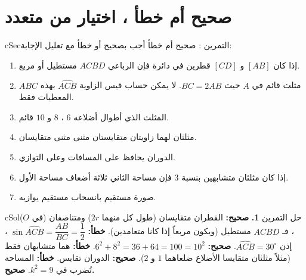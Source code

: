\documentclass[12pt,a4paper]{article}
\newenvironment{BOX}[2]{\begin{otherlanguage}{english}\begin{arbox}{#1}{#2}}{\end{arbox}\end{otherlanguage}}
\newcounter{exo}
\newenvironment{tamrin}[1]{\stepcounter{exo}\begin{BOX}{cSec}{التمرين \theexo: #1}}{\end{BOX}}
\newenvironment{hal}{\Needspace{12\baselineskip}\begin{otherlanguage}{english}\begin{arbox}[breakable]{cSol}{حل التمرين \theexo}}{\end{arbox}\end{otherlanguage}}
\begin{document}
\section{صحيح أم خطأ ، اختيار من متعدد}
\begin{tamrin}{صحيح أم خطأ}
أجب بصحيح أو خطأ مع تعليل الإجابة:
\begin{enumerate}
\item إذا كان $[AB]$ و $[CD]$ قطرين في دائرة فإن الرباعي $ACBD$ مستطيل أو مربع.
\item $ABC$ مثلث قائم في $A$ حيث $BC=2AB$. لا يمكن حساب قيس الزاوية $\widehat{ACB}$ بهذه المعطيات فقط.
\item المثلث الذي أطوال أضلاعه $6$ ، $8$ و $10$ قائم.
\item مثلثان لهما زاويتان متقايستان مثنى مثنى متقايسان.
\item الدوران يحافظ على المسافات وعلى التوازي.
\item إذا كان مثلثان متشابهين بنسبة $3$ فإن مساحة الثاني ثلاثة أضعاف مساحة الأول.
\item صورة مستقيم بانسحاب مستقيم يوازيه.
\end{enumerate}
\end{tamrin}
\begin{hal}
\textbf{1.} \textbf{صحيح:} القطران متقايسان (طول كل منهما $2r$) ومتناصفان (في $O$) ، فـ $ACBD$ مستطيل (ويكون مربعاً إذا كانا متعامدين).
 \textbf{خطأ:} $\sin\widehat{ACB}=\dfrac{AB}{BC}=\dfrac12$ ، إذن $\widehat{ACB}=30^\circ$.
 \textbf{صحيح:} $6^2+8^2=36+64=100=10^2$.
 \textbf{خطأ:} هما متشابهان فقط (مثلاً مثلثان متقايسا الأضلاع ضلعاهما $1$ و $2$).
 \textbf{صحيح:} الدوران تقايس.
 \textbf{خطأ:} المساحة تُضرب في $k^2=9$.
 \textbf{صحيح.}
\end{hal}
\end{document}
